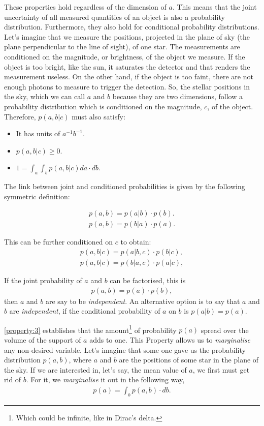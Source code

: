 These properties hold regardless of the dimension of $a$. This means that the joint uncertainty of all measured quantities of an object is also a probability distribution. Furthermore, they also hold for conditional probability distributions. Let's imagine that we measure the positions, projected in the plane of sky (the plane perpendicular to the line of sight), of one star. The measurements are conditioned on the magnitude, or brightness, of the object we measure. If the object is too bright, like the sun, it saturates the detector and that renders the measurement useless. On the other hand, if the object is too faint, there are not enough photons to measure to trigger the detection. So, the stellar positions in the sky, which we can call $a$ and $b$ because they are two dimensions, follow a probability distribution which is conditioned on the magnitude, $c$, of the object. Therefore, $p(a,b|c)$ must also satisfy:

\begin{itemize}
\item It has units of $a^{-1} b^{-1}$.
\item $p(a,b|c)\geq0$.
\item $1=\int_a \int_b p(a,b|c)da\cdot db$.
\end{itemize}

The link between joint and conditioned probabilities is given by the following symmetric definition:

\begin{align}
p(a,b)=p(a|b)\cdot p(b).\nonumber \\
p(a,b)=p(b|a) \cdot p(a).
\end{align}

This can be further conditioned on $c$ to obtain:
\begin{align}
\label{eq:conditioned}
p(a,b|c)=p(a|b,c)\cdot p(b|c),\nonumber \\
p(a,b|c)=p(b|a,c) \cdot p(a|c),
\end{align}

If the joint probability of $a$ and $b$ can be factorised, this is
\begin{align}
p(a,b)=p(a)\cdot p(b),
\end{align}
then $a$ and $b$ are say to be \emph{independent}. An alternative option is to say that $a$ and $b$ are \emph{independent}, if the conditional probability of $a$ on $b$ is $p(a|b)=p(a)$.

\ref{property:3} establishes that the amount\footnote{Which could be infinite, like in Dirac's delta.} of probability $p(a)$ spread over the volume of the support of $a$ adds to one. This Property allows us to \emph{marginalise} any non-desired variable. Let's imagine that some one gave us the probability distribution $p(a,b)$, where $a$ and $b$ are the positions of some star in the plane of the sky. If we are interested in, let's say, the mean value of $a$, we first must get rid of $b$. For it, we \emph{marginalise} it out in the following way,
\begin{align}
\label{eq:marginalisation}
p(a)=\int_b p(a,b)\cdot db.
\end{align}




